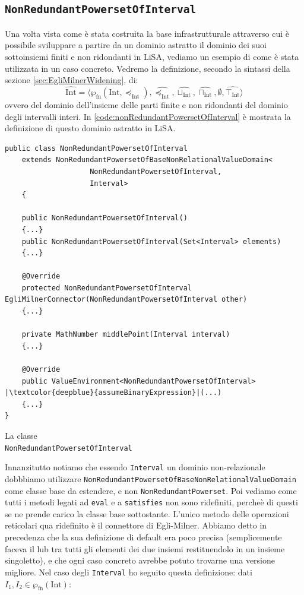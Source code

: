\subsection{\texttt{NonRedundantPowersetOfInterval}}



Una volta vista come è stata costruita la base infrastrutturale attraverso cui è possibile sviluppare a partire da un dominio astratto il dominio dei suoi sottoinsiemi finiti e non ridondanti in LiSA, vediamo un esempio di come è stata utilizzata in un caso concreto. Vedremo la definizione, secondo la sintassi della sezione \ref{sec:EgliMilnerWidening}, di:
\[\widehat{\textrm{Int}} = \langle \wp_{\textrm{fn}}(\textrm{Int}, \preceq_\textrm{Int}),\widehat{\preceq_{\textrm{Int}}}, \widehat{\sqcup_{\textrm{Int}}}, \widehat{\sqcap_{\textrm{Int}}}, \emptyset, \widehat{\top_{\textrm{Int}}} \rangle\]
ovvero del dominio dell'insieme delle parti finite e non ridondanti del dominio degli intervalli interi. In \ref{code:nonRedundantPowersetOfInterval} è mostrata la definizione di questo dominio astratto in LiSA. 
\begin{algorithm}
\lstset{frame=none}
\begin{lstlisting}[belowskip=-1.1 \baselineskip, escapechar=|]
public class NonRedundantPowersetOfInterval
    extends NonRedundantPowersetOfBaseNonRelationalValueDomain<
                    NonRedundantPowersetOfInterval, 
                    Interval> 
    {

    public NonRedundantPowersetOfInterval() 
    {...}
    public NonRedundantPowersetOfInterval(Set<Interval> elements) 
    {...}
    
    @Override
    protected NonRedundantPowersetOfInterval EgliMilnerConnector(NonRedundantPowersetOfInterval other) 
    {...}
    
    private MathNumber middlePoint(Interval interval) 
    {...}
    
    @Override
    public ValueEnvironment<NonRedundantPowersetOfInterval> |\textcolor{deepblue}{assumeBinaryExpression}|(...) 
    {...}
}
\end{lstlisting}
\caption{La classe \\ \texttt{NonRedundantPowersetOfInterval}}
\label{code:nonRedundantPowersetOfInterval}
\end{algorithm}
Innanzitutto notiamo che essendo \texttt{Interval} un dominio non-relazionale dobbbiamo utilizzare \texttt{NonRedundantPowersetOfBaseNonRelationalValueDomain} come classe base da estendere, e non \texttt{NonRedundantPowerset}. Poi vediamo come tutti i metodi legati ad \texttt{eval} e a \texttt{satisfies} non sono ridefiniti, percheè di questi se ne prende carico la classe base sottostante. L'unico metodo delle operazioni reticolari qua ridefinito è il connettore di Egli-Milner. Abbiamo detto in precedenza che la sua definizione di default era poco precisa (semplicemente faceva il lub tra tutti gli elementi dei due insiemi restituendolo in un insieme singoletto), e che ogni caso concreto avrebbe potuto trovarne una versione migliore. Nel caso degli \texttt{Interval} ho seguito questa definizione: dati \(I_1, I_2\in\wp_{\textrm{fn}}(\textrm{Int})\): 

